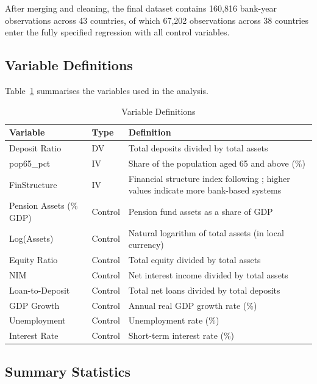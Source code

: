\documentclass[12pt,a4paper]{article}
\begin{document}
After merging and cleaning, the final dataset contains 160,816 bank-year observations across 43 countries, of which 67,202 observations across 38 countries enter the fully specified regression with all control variables.

\subsection{Variable Definitions}

Table~\ref{tab:variables} summarises the variables used in the analysis.

\begin{table}[H]
\centering
\caption{Variable Definitions}
\label{tab:variables}
\small
\begin{threeparttable}
\begin{tabularx}{\textwidth}{l l X}
\toprule
\textbf{Variable} & \textbf{Type} & \textbf{Definition} \\
\midrule
Deposit Ratio & DV & Total deposits divided by total assets \\
pop65\_pct & IV & Share of the population aged 65 and above (\%) \\
FinStructure & IV & Financial structure index following \citet{Levine2002}; higher values indicate more bank-based systems \\
Pension Assets (\% GDP) & Control & Pension fund assets as a share of GDP \\
Log(Assets) & Control & Natural logarithm of total assets (in local currency) \\
Equity Ratio & Control & Total equity divided by total assets \\
NIM & Control & Net interest income divided by total assets \\
Loan-to-Deposit & Control & Total net loans divided by total deposits \\
GDP Growth & Control & Annual real GDP growth rate (\%) \\
Unemployment & Control & Unemployment rate (\%) \\
Interest Rate & Control & Short-term interest rate (\%) \\
\bottomrule
\end{tabularx}
\end{threeparttable}
\end{table}

\subsection{Summary Statistics}
\end{document}
